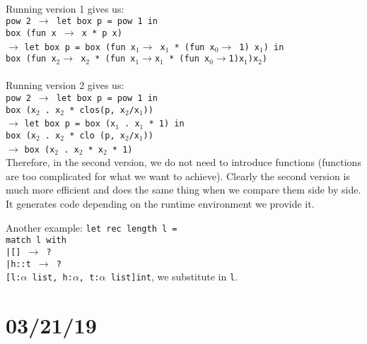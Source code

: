 \documentclass[12 pt]{article}
\newcommand{\mybox}{%
\collectbox{%
	\setlength{\fboxsep}{3pt}%
	\fbox{\BOXCONTENT}%
	}%
}
\begin{document}
\\ Running version 1 gives us:
\\ \texttt{pow 2 $\to$ let box p = pow 1 in}
\\ \phantom{pow 2 $\to$}\hspace{1 em}\texttt{box (fun x $\to$
	x * p x)}
\\ \phantom{pow 2} $\to$ \texttt{let box p = box (fun x$_1
		\to$ x$_1$ * (fun x$_0 \to$ 1) x$_1$) in}
\\ \phantom{pow 2 $\to$}\hspace{1 em}\texttt{box (fun
	x$_2\to$ x$_2$ * (fun x$_1 \to$x$_1$ * (fun
	x$_0\to$1)x$_1$)x$_2$)}
\\
\\ Running version 2 gives us:
\\ \texttt{pow 2 $\to$ let box p = pow 1 in}
\\ \phantom{pow 2 $\to$}\hspace{1 em}\texttt{box (x$_2$ .
	x$_2$ * clos(p, x$_2$/x$_1$))}
\\ \phantom{pow 2} $\to$ \texttt{let box p = box (x$_1
	$ . x$_1$ * 1) in}
\\ \phantom{pow 2 $\to$}\hspace{1 em}\texttt{box (x$_2$
	. x$_2$ * clo (p, x$_2$/x$_1$))}
\\ \phantom{pow 2}$\to$ \texttt{box (x$_2$ . x$_2$ * x$_2$ *
	1)}
\\
Therefore, in the second version, we do not need to introduce
functions (functions are too complicated for what we want to
achieve). Clearly the second version is much more efficient and does
the same thing when we compare them side by side. It generates code
depending on the runtime environment we provide it.

Another example:
\texttt{let rec length l =}
\\\phantom{a} \hspace{1 em} \texttt{match l with}
\\ \phantom{a} \hspace{2 em} \texttt{|[] $\to$ ?}
\\ \phantom{a} \hspace{2 em} \texttt{|h::t $\to$ \mybox{?}}
\\ \texttt{[l:$\alpha$ list, h:$\alpha$, t:$\alpha$ list]int},
we substitute in \texttt{l}.
\section{03/21/19}
\end{document}
